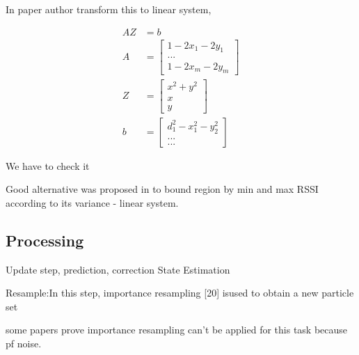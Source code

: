 \documentclass[a4paper, 12pt]{article}
\begin{document}
In paper author transform this to linear system, 

\begin{align}
AZ & = b \\
A &= \begin{bmatrix} 
1 - 2 x_1 - 2 y_1 \\
... \\
1 - 2 x_m - 2 y_m
\end{bmatrix} \\
Z &= \begin{bmatrix} 
x^2 + y^2 \\
x \\
y
\end{bmatrix} \\
b &= \begin{bmatrix} 
d_1^2 - x_1^2 - y_2^2\\
...\\
...
\end{bmatrix}
\end{align}

We have to check it

Good alternative was proposed in \cite{} to bound region by min and max RSSI according to its variance - linear system.

\subsection{Processing}

Update step, prediction, correction
State Estimation


Resample:In  this  step,  importance  resampling  [20]  isused to obtain a new particle set

some papers prove importance resampling can't be applied for this task because pf noise.





\end{document}
